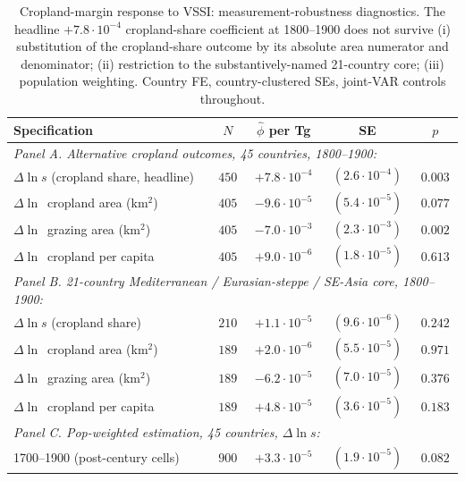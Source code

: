 \documentclass[11pt,letterpaper]{article}
\begin{document}
\begin{table}[H]
\centering
\caption{Cropland-margin response to VSSI: measurement-robustness diagnostics. The headline $+7.8\!\cdot\!10^{-4}$ cropland-share coefficient at 1800--1900 does not survive (i) substitution of the cropland-share outcome by its absolute area numerator and denominator; (ii) restriction to the substantively-named 21-country core; (iii) population weighting. Country FE, country-clustered SEs, joint-VAR controls throughout.}
\label{tab:boserup-robust}
\small
\begin{tabular}{lcccc}
\toprule
Specification & $N$ & $\hat\phi$ per Tg & SE & $p$ \\
\midrule
\multicolumn{5}{l}{\textit{Panel A. Alternative cropland outcomes, 45 countries, 1800--1900:}} \\
$\Delta \ln s$ (cropland share, headline)             & $450$ & $+7.8\!\cdot\!10^{-4}$ & $(2.6\!\cdot\!10^{-4})$ & $0.003$ \\
$\Delta \ln$~cropland area (km$^2$)                   & $405$ & $-9.6\!\cdot\!10^{-5}$ & $(5.4\!\cdot\!10^{-5})$ & $0.077$ \\
$\Delta \ln$~grazing area (km$^2$)                    & $405$ & $-7.0\!\cdot\!10^{-3}$ & $(2.3\!\cdot\!10^{-3})$ & $0.002$ \\
$\Delta \ln$~cropland per capita                      & $405$ & $+9.0\!\cdot\!10^{-6}$ & $(1.8\!\cdot\!10^{-5})$ & $0.613$ \\
\midrule
\multicolumn{5}{l}{\textit{Panel B. 21-country Mediterranean / Eurasian-steppe / SE-Asia core, 1800--1900:}} \\
$\Delta \ln s$ (cropland share)                       & $210$ & $+1.1\!\cdot\!10^{-5}$ & $(9.6\!\cdot\!10^{-6})$ & $0.242$ \\
$\Delta \ln$~cropland area (km$^2$)                   & $189$ & $+2.0\!\cdot\!10^{-6}$ & $(5.5\!\cdot\!10^{-5})$ & $0.971$ \\
$\Delta \ln$~grazing area (km$^2$)                    & $189$ & $-6.2\!\cdot\!10^{-5}$ & $(7.0\!\cdot\!10^{-5})$ & $0.376$ \\
$\Delta \ln$~cropland per capita                      & $189$ & $+4.8\!\cdot\!10^{-5}$ & $(3.6\!\cdot\!10^{-5})$ & $0.183$ \\
\midrule
\multicolumn{5}{l}{\textit{Panel C. Pop-weighted estimation, 45 countries, $\Delta \ln s$:}} \\
1700--1900 (post-century cells)                      & $900$ & $+3.3\!\cdot\!10^{-5}$ & $(1.9\!\cdot\!10^{-5})$ & $0.082$ \\

\end{tabular}
\end{table}
\end{document}
